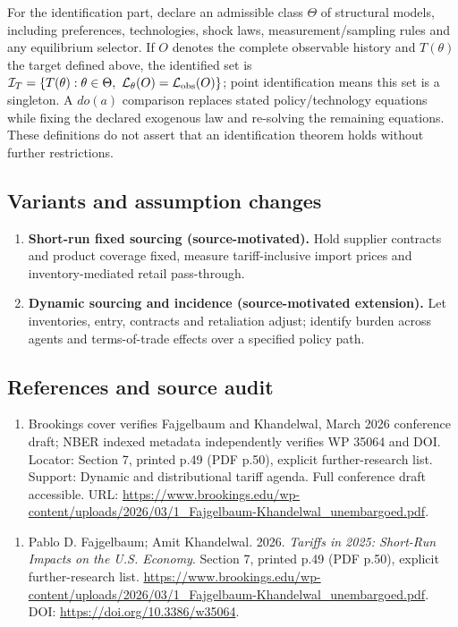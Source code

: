 \documentclass[11pt,a4paper]{article}
\begin{document}
For the identification part, declare an admissible class \(\Theta\) of structural models, including preferences, technologies, shock laws, measurement/sampling rules and any equilibrium selector. If \(O\) denotes the complete observable history and \(T(\theta)\) the target defined above, the identified set is \(\mathcal I_T=\{T(\theta):\theta\in\Theta,\ \mathcal L_\theta(O)=\mathcal L_{\rm obs}(O)\}\); point identification means this set is a singleton. A \(do(a)\) comparison replaces stated policy/technology equations while fixing the declared exogenous law and re-solving the remaining equations. These definitions do not assert that an identification theorem holds without further restrictions.
\subsection*{Variants and assumption changes}
\begin{enumerate}
\item \textbf{Short-run fixed sourcing (source-motivated).} Hold supplier contracts and product coverage fixed, measure tariff-inclusive import prices and inventory-mediated retail pass-through.
\item \textbf{Dynamic sourcing and incidence (source-motivated extension).} Let inventories, entry, contracts and retaliation adjust; identify burden across agents and terms-of-trade effects over a specified policy path.
\end{enumerate}
\subsection*{References and source audit}
\begin{enumerate}
\item Brookings cover verifies Fajgelbaum and Khandelwal, March 2026 conference draft; NBER indexed metadata independently verifies WP 35064 and DOI. Locator: Section 7, printed p.49 (PDF p.50), explicit further-research list. Support: Dynamic and distributional tariff agenda. Full conference draft accessible. URL: \url{https://www.brookings.edu/wp-content/uploads/2026/03/1_Fajgelbaum-Khandelwal_unembargoed.pdf}.
\end{enumerate}
\begin{enumerate}\raggedright
\item\hypertarget{definitions:source:30007624:1}{} Pablo D. Fajgelbaum; Amit Khandelwal. 2026. \emph{Tariffs in 2025: Short-Run Impacts on the U.S. Economy}. Section 7, printed p.49 (PDF p.50), explicit further-research list.
\url{https://www.brookings.edu/wp-content/uploads/2026/03/1_Fajgelbaum-Khandelwal_unembargoed.pdf}.
DOI: \url{https://doi.org/10.3386/w35064}.
\end{enumerate}
\end{document}
